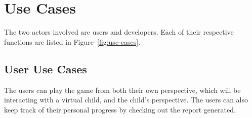 \chapter{Use Cases} %

The two actors involved are users and developers. Each of their respective functions are listed in Figure~\ref{fig:use-cases}.

\section{User Use Cases}
The users can play the game from both their own perspective, which will be interacting with a virtual child, and the child's perspective. The users can also keep track of their personal progress by checking out the report generated.

\begin{table}[h!]
\centering
\caption{Play as Parent Use Case}
\label{table:game-with-child}
\vspace{5mm}
\end{table}

\begin{table}[h!]
\centering
\caption{Play as Child Use Case}
\label{table:game-with-child}
\vspace{5mm}
\end{table}

